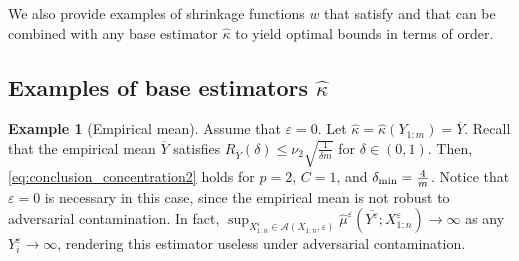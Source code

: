 \documentclass{article}
\theoremstyle{plain}
\theoremstyle{definition}
\newtheorem{example}{Example}
\def\sA{\mathcal{A}}
\begin{document}
We also provide examples of shrinkage functions \( w \) that satisfy  and that can be combined with any base estimator \( \widehat{\kappa }  \) to yield optimal bounds in terms of order. 
\subsection{Examples of base estimators \( \widehat{\kappa }  \)}\label{sec:examples_kappa}


\begin{example}[Empirical mean]\label{ex:empirical_mean_sub_gaussian}
  Assume that \( \varepsilon = 0 \). Let \( \widehat{\kappa}=\widehat{\kappa }(Y_{1:m})=\overline{Y}   \). Recall that the empirical mean $\overline{Y}$ satisfies $R_{\overline{Y}}(\delta) \leq \nu_2 \sqrt{\frac{1}{\delta m}} $ for \( \delta \in (0,1) \). Then, \eqref{eq:conclusion_concentration2} holds for \( p=2 \), \( C=1 \), and \( \delta_{\textup{min}}= \frac{4}{m} \). Notice that \( \varepsilon = 0 \) is necessary in this case, since the empirical mean is not robust to adversarial contamination. In fact, \( \sup_{X_{1:n}^\varepsilon \in \sA(X_{1:n},\varepsilon )}\widehat{\mu}^{\varepsilon }\left(\overline{Y^\varepsilon };X_{1:n}^\varepsilon \right) \to \infty \) as any \( Y_i^{\varepsilon}\to \infty \), rendering this estimator useless under adversarial contamination.
\end{example}
\end{document}
